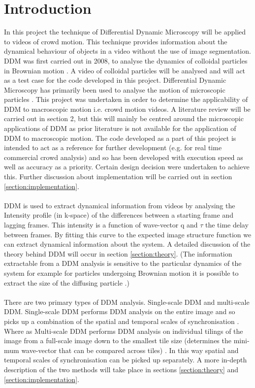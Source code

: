 \documentclass[10pt]{article}
\begin{document}
\clearpage
\tableofcontents

\clearpage
\section{Introduction}
In this project the technique of Differential Dynamic Microscopy will be applied to videos of crowd motion. This technique provides information about the dynamical behaviour of objects in a video without the use of image segmentation. DDM was first carried out in 2008, to analyse the dynamics of colloidal particles in Brownian motion \cite{ddm0}. A video of colloidal particles will be analysed and will act as a test case for the code developed in this project. Differential Dynamic Microscopy has primarily been used to analyse the motion of microscopic particles \cite{ddm1} \cite{ddm2}. This project was undertaken in order to determine the applicability of DDM to macroscopic motion i.e. crowd motion videos. A literature review will be carried out in section 2, but this will mainly be centred around the microscopic applications of DDM as prior literature is not available for the application of DDM to macroscopic motion. The code developed as a part of this project is intended to act as a reference for further development (e.g. for real time commercial crowd analysis) and so has been developed with execution speed as well as accuracy as a priority. Certain design decision were undertaken to achieve this. Further discussion about implementation will be carried out in section \ref{section:implementation}.
\\\\
DDM is used to extract dynamical information from videos by analysing the Intensity profile (in k-space) of the differences between a starting frame and lagging frames. This intensity is a function of wave-vector q and $\tau$ the time delay between frames. By fitting this curve to the expected image structure function we can extract dynamical information about the system. A detailed discussion of the theory behind DDM will occur in section \ref{section:theory}. (The information extractable from a DDM analysis is sensitive to the particular dynamics of the system for example for particles undergoing Brownian motion it is possible to extract the size of the diffusing particle \cite{ddm1}.)
\\\\
There are two primary types of DDM analysis. Single-scale DDM and multi-scale DDM. Single-scale DDM performs DDM analysis on the entire image and so picks up a combination of the spatial and temporal scales of synchronisation \cite{ddm2}. Where as Multi-scale DDM performs DDM analysis on individual tilings of the image from a full-scale image down to the smallest tile size (determines the mini-mum wave-vector that can be compared across tiles) \cite{ddm2}. In this way spatial and temporal scales of synchronisation can be picked up separately. A more in-depth description of the two methods will take place in sections \ref{section:theory} and \ref{section:implementation}.  
\end{document}
